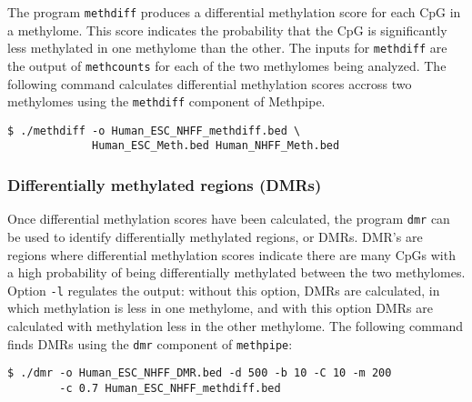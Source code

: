 \documentclass[10pt]{article}
\newcommand{\meth}{\texttt{methpipe}}
\newcommand{\prog}[1]{\texttt{#1}}
\newcommand{\op}[1]{\texttt{#1}}
\begin{document}
The program \prog{methdiff} produces a differential methylation score
for each CpG in a methylome. This score indicates the probability that
the CpG is significantly less methylated in one methylome than the
other. The inputs for \prog{methdiff} are the output of
\prog{methcounts} for each of the two methylomes being analyzed. The
following command calculates differential methylation scores accross
two methylomes using the \prog{methdiff} component of Methpipe.
\begin{verbatim}
$ ./methdiff -o Human_ESC_NHFF_methdiff.bed \
             Human_ESC_Meth.bed Human_NHFF_Meth.bed
\end{verbatim}





\subsubsection{Differentially methylated regions (DMRs)}
\label{sec:dmr}

Once differential methylation scores have been calculated, the program
\prog{dmr} can be used to identify differentially methylated
regions, or DMRs. DMR's are regions where differential methylation
scores indicate there are many CpGs with a high probability of being
differentially methylated between the two methylomes.  Option
\op{-l} regulates the output: without this option, DMRs are
calculated, in which methylation is less in one methylome, and with
this option DMRs are calculated with methylation less in the other
methylome. The following command finds DMRs using the \prog{dmr}
component of \meth{}:
\begin{verbatim}
$ ./dmr -o Human_ESC_NHFF_DMR.bed -d 500 -b 10 -C 10 -m 200
        -c 0.7 Human_ESC_NHFF_methdiff.bed
\end{verbatim}
\end{document}

